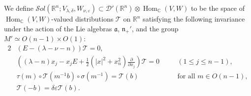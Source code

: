 \begin{definition}
\label{def:solVW}
We define 
${\mathcal{S}}ol
({\mathbb{R}}^n;V_{\lambda, \delta}, W_{\nu, \varepsilon})
\subset
{\mathcal{D}}'({\mathbb{R}}^n)
    \otimes 
    \operatorname{Hom}_{{\mathbb{C}}}(V,W)
$
to be the space of $\operatorname{Hom}_{\mathbb{C}}(V,W)$-valued
 distributions 
${\mathcal{T}}$ on ${\mathbb{R}}^n$
 satisfying 
the following invariance 
under the action of the Lie algebras
 ${\mathfrak{a}}$, ${\mathfrak{n}}_+'$, 
 and the group $M' \simeq O(n-1) \times O(1)$:
\begin{alignat}{2}
&(E-(\lambda-\nu-n)){\mathcal{T}}=0, 
&&
\label{eqn:Fainv}
\\
&\left((\lambda-n)x_j - x_j E + \frac 1 2 (|x|^2 + x_n^2)\frac{\partial}{\partial x_j}\right){\mathcal{T}}=0
\quad
&&(1 \le j \le n-1), 
\label{eqn:Fninv}
\\
&\tau(m) \circ {\mathcal{T}}(m^{-1}b)\circ \sigma(m^{-1})={\mathcal{T}}(b)
\quad
&&\text{for all } m \in O(n-1), 
\label{eqn:FMinv}
\\
&{\mathcal{T}}(-b)= \delta \varepsilon {\mathcal{T}}(b).  
&&
\label{eqn:Fparity}
\end{alignat}
\end{definition}


